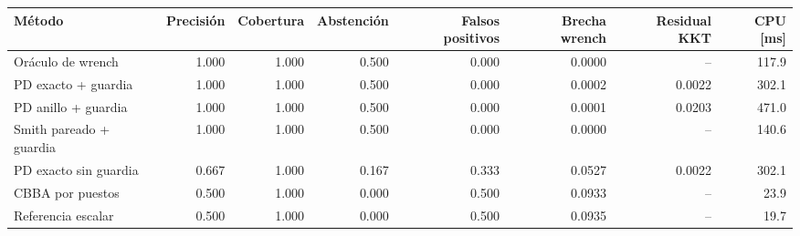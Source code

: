 \begin{tabular}{lrrrrrrr}
\toprule
Método & Precisión & Cobertura & Abstención & Falsos positivos & Brecha wrench & Residual KKT & CPU [ms] \\
\midrule
Oráculo de wrench & 1.000 & 1.000 & 0.500 & 0.000 & 0.0000 & -- & 117.9 \\
PD exacto + guardia & 1.000 & 1.000 & 0.500 & 0.000 & 0.0002 & 0.0022 & 302.1 \\
PD anillo + guardia & 1.000 & 1.000 & 0.500 & 0.000 & 0.0001 & 0.0203 & 471.0 \\
Smith pareado + guardia & 1.000 & 1.000 & 0.500 & 0.000 & 0.0000 & -- & 140.6 \\
PD exacto sin guardia & 0.667 & 1.000 & 0.167 & 0.333 & 0.0527 & 0.0022 & 302.1 \\
CBBA por puestos & 0.500 & 1.000 & 0.000 & 0.500 & 0.0933 & -- & 23.9 \\
Referencia escalar & 0.500 & 1.000 & 0.000 & 0.500 & 0.0935 & -- & 19.7 \\
\bottomrule
\end{tabular}
